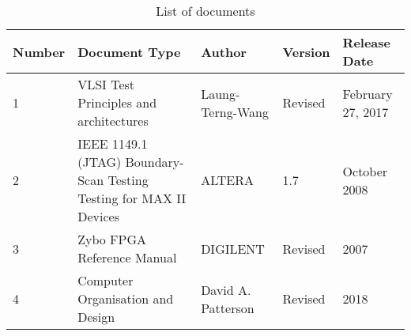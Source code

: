 	\begin{table}[H]
		\centering
		\begin{tabularx}{\textwidth}{|p{3cm}|X|X|X|X|}
			\hline
			\textbf{Number} & \textbf{Document Type} & \textbf{Author} & \textbf{Version} & \textbf{Release Date} \\
			\hline \hline
			\hspace{13mm}1 &  VLSI Test Principles and architectures & Laung-Terng-Wang & \hspace{8mm}Revised & February 27, 2017 \\
            \hline
            \hspace{13mm}2 & IEEE 1149.1 (JTAG) Boundary-Scan Testing Testing for MAX II Devices & \hspace{7mm}ALTERA & \hspace{11mm}1.7 & \hspace{5mm}October 2008 \\
			\hline
            \hspace{13mm}3 & Zybo FPGA Reference Manual & \hspace{7mm}DIGILENT & \hspace{11mm}Revised & \hspace{11mm} 2007 \\
            \hline
            \hspace{13mm}4 & Computer Organisation and Design & \hspace{1mm}David A. Patterson & \hspace{11mm}Revised & \hspace{11mm} 2018 \\
            \hline
		\end{tabularx}
		\caption{List of documents}
		\label{tab:01List of documents}
	\end{table}